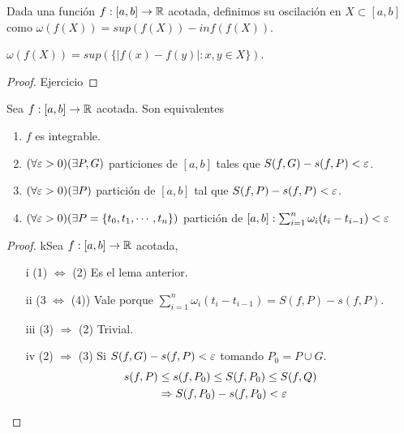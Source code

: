 \begin{definition}[Oscilación]
  Dada una función \(f: [a, b] \to \mathbb{R}\) acotada, definimos su oscilación en \(X \subset [a, b]\) como \(\omega(f(X)) = sup(f(X)) - inf(f(X))\).
\end{definition}

\begin{note}
  \(\omega(f(X)) = sup(\{ |f(x) - f(y)| : x,y \in X \})\).
  \begin{proof}
    Ejercicio
  \end{proof}
\end{note}

\clearpage

\begin{theorem}
  Sea \(f: [a, b] \to \mathbb{R}\) acotada. Son equivalentes \begin{enumerate}
    \item \(f\) es integrable.
    \item \((\forall \varepsilon > 0)(\exists P, G)\) particiones de \([a, b]\) tales que \(S(f, G) - s(f, P) < \varepsilon\).
    \item \((\forall \varepsilon > 0)(\exists P)\) partición de \([a, b]\) tal que \(S(f, P) - s(f, P) < \varepsilon\).
    \item \((\forall \varepsilon > 0)(\exists P = \{ t_0, t_1, \cdots, t_n \})\) partición de \([a, b] : \sum_{i = 1}^n \omega_i (t_i - t_{i-1}) < \varepsilon\)
  \end{enumerate}

  \begin{proof}
    kSea \(f: [a,b] \to \mathbb{R}\) acotada,
    \begin{enumerate}
      \item[i] (1) \(\iff\) (2) Es el lema anterior.
      \item[ii] (3 \(\iff\) (4)) Vale porque \(\sum_{i = 1}^n \omega_i (t_i - t_{i-1}) = S(f, P) - s(f, P)\).
      \item[iii] (3) \(\Rightarrow\) (2) Trivial.
      \item[iv] (2) \(\Rightarrow\) (3) Si \(S(f, G) - s(f, P) < \varepsilon\) tomando \(P_0 = P \cup G\). \begin{align*}
              s(f, P) & \leq s(f, P_0) \leq S(f, P_0) \leq S(f, Q) \\
                      & \Rightarrow S(f, P_0) - s(f, P_0) < \varepsilon
            \end{align*}
    \end{enumerate}
  \end{proof}
\end{theorem}

